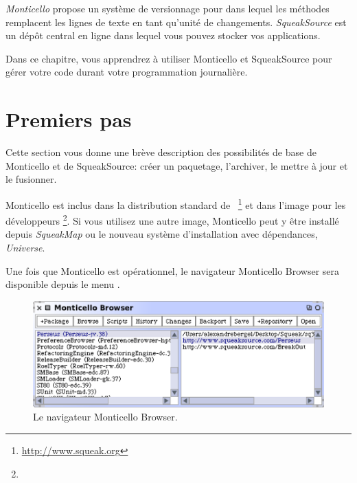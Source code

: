 \documentclass[a4paper,10pt,twoside]{book}
\begin{document}
\emph{Monticello} propose un syst\`eme de versionnage pour \sq dans
lequel les m\'ethodes remplacent les lignes de texte en tant qu'unit\'e
de changements. %
\emph{SqueakSource}  est un d\'ep\^ot central en ligne dans lequel
vous pouvez stocker vos applications.

Dans ce chapitre, vous apprendrez \`a utiliser Monticello et
SqueakSource pour g\'erer votre code durant votre programmation journali\`ere.


\section{Premiers pas} %

Cette section vous donne une br\`eve description des possibilit\'es de
base de Monticello et de SqueakSource: cr\'eer un paquetage,
l'archiver, le mettre \`a jour et le fusionner.

Monticello est inclus dans la distribution standard de
\sq~\footnote{\url{http://www.squeak.org}} et dans l'image pour les
d\'eveloppeurs \footnote{\squeakdev}. Si vous utilisez une autre
image, Monticello peut y \^etre install\'e depuis  \emph{SqueakMap} ou
le nouveau syst\`eme d'installation avec d\'ependances,
\emph{Universe}.

Une fois que Monticello est op\'erationnel, le navigateur Monticello
Browser sera disponible depuis le menu 
.

\begin{figure}[ht]\centering
	\includegraphics[width=.75\linewidth]{monticello}
	\caption{Le navigateur Monticello Browser.}
\end{figure}
\end{document}
